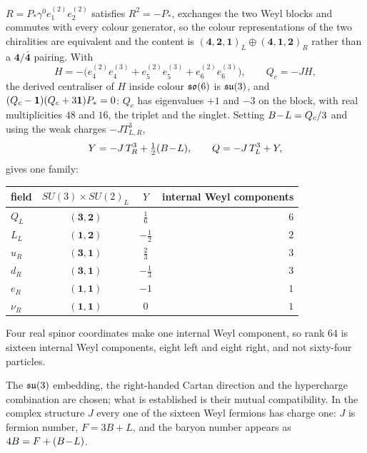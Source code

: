 \begin{proposition}
\label{prop:PSledger}
$R=P_*\gamma^0e^{(2)}_1e^{(2)}_2$ satisfies $R^2=-P_*$, exchanges the two Weyl blocks and commutes with every colour generator, so the
colour representations of the two chiralities are equivalent and the content is $(\mathbf4,\mathbf2,\mathbf1)_L\oplus(\mathbf4,\mathbf1,
\mathbf2)_R$ rather than a $\mathbf4/\bar{\mathbf4}$ pairing. With
\[
H=-\bigl(e^{(2)}_4e^{(3)}_4+e^{(2)}_5e^{(3)}_5+e^{(2)}_6e^{(3)}_6\bigr),\qquad Q_c=-JH,
\]
the derived centraliser of $H$ inside colour $\mathfrak{so}(6)$ is $\mathfrak{su}(3)$, and $(Q_c-\mathbf 1)(Q_c+3\mathbf 1)P_*=0$: $Q_c$ has eigenvalues $+1$ and $-3$ on
the block, with real multiplicities $48$ and $16$, the triplet and the singlet. Setting $B\!-\!L=Q_c/3$ and using the weak charges
$-JT^3_{L,R}$,
\[
Y=-J\,T^3_R+\tfrac12(B\!-\!L),\qquad Q=-J\,T^3_L+Y ,
\]
gives one family:
\begin{center}
\begin{tabular}{@{}lccr@{}}
\toprule
field & $SU(3)\times SU(2)_L$ & $Y$ & internal Weyl components\\
\midrule
$Q_L$ & $(\mathbf3,\mathbf2)$ & $\tfrac16$ & $6$\\
$L_L$ & $(\mathbf1,\mathbf2)$ & $-\tfrac12$ & $2$\\
$u_R$ & $(\mathbf3,\mathbf1)$ & $\tfrac23$ & $3$\\
$d_R$ & $(\mathbf3,\mathbf1)$ & $-\tfrac13$ & $3$\\
$e_R$ & $(\mathbf1,\mathbf1)$ & $-1$ & $1$\\
$\nu_R$ & $(\mathbf1,\mathbf1)$ & $0$ & $1$\\
\bottomrule
\end{tabular}
\end{center}
Four real spinor coordinates make one internal Weyl component, so rank $64$ is sixteen internal Weyl components, eight left and eight
right, and not sixty-four particles.
\end{proposition}

The $\mathfrak{su}(3)$ embedding, the right-handed Cartan direction and the hypercharge combination are chosen; what is established is their
mutual compatibility. In the complex structure $J$ every one of the sixteen Weyl fermions has charge one: $J$ is fermion number,
$F=3B+L$, and the baryon number appears as $4B=F+(B\!-\!L)$.

